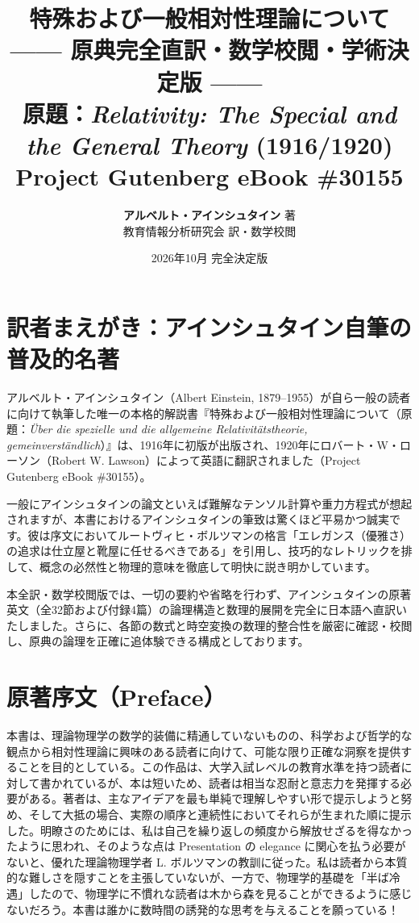 \documentclass[a4paper,11pt,openany]{ltjsbook}
\title{
    {\huge\bfseries\gtfamily 特殊および一般相対性理論について}\\[12pt]
    {\Large\gtfamily —— 原典完全直訳・数学校閲・学術決定版 ——}\\[18pt]
    {\large 原題：\textit{Relativity: The Special and the General Theory} (1916/1920)}\\[6pt]
    {\normalsize Project Gutenberg eBook \#30155}
}
\author{\textbf{アルベルト・アインシュタイン} 著\\[4pt]教育情報分析研究会 訳・数学校閲}
\date{2026年10月 完全決定版}
\begin{document}
\maketitle

\frontmatter

\chapter*{訳者まえがき：アインシュタイン自筆の普及的名著}

アルベルト・アインシュタイン（Albert Einstein, 1879--1955）が自ら一般の読者に向けて執筆した唯一の本格的解説書『特殊および一般相対性理論について（原題：\textit{Über die spezielle und die allgemeine Relativitätstheorie, gemeinverständlich}）』は、1916年に初版が出版され、1920年にロバート・W・ローソン（Robert W. Lawson）によって英語に翻訳されました（Project Gutenberg eBook \#30155）。

一般にアインシュタインの論文といえば難解なテンソル計算や重力方程式が想起されますが、本書におけるアインシュタインの筆致は驚くほど平易かつ誠実です。彼は序文においてルートヴィヒ・ボルツマンの格言「エレガンス（優雅さ）の追求は仕立屋と靴屋に任せるべきである」を引用し、技巧的なレトリックを排して、概念の必然性と物理的意味を徹底して明快に説き明かしています。

本全訳・数学校閲版では、一切の要約や省略を行わず、アインシュタインの原著英文（全32節および付録4篇）の論理構造と数理的展開を完全に日本語へ直訳いたしました。さらに、各節の数式と時空変換の数理的整合性を厳密に確認・校閲し、原典の論理を正確に追体験できる構成としております。

\clearpage
\tableofcontents
\clearpage

\mainmatter


\clearpage
\chapter*{原著序文（Preface）}

本書は、理論物理学の数学的装備に精通していないものの、科学および哲学的な観点から相対性理論に興味のある読者に向けて、可能な限り正確な洞察を提供することを目的としている。この作品は、大学入試レベルの教育水準を持つ読者に対して書かれているが、本は短いため、読者は相当な忍耐と意志力を発揮する必要がある。著者は、主なアイデアを最も単純で理解しやすい形で提示しようと努め、そして大抵の場合、実際の順序と連続性においてそれらが生まれた順に提示した。明瞭さのためには、私は自己を繰り返しの頻度から解放せざるを得なかったように思われ、そのような点は Presentation の elegance に関心を払う必要がないと、優れた理論物理学者 L. ボルツマンの教訓に従った。私は読者から本質的な難しさを隠すことを主張していないが、一方で、物理学的基礎を「半ば冷遇」したので、物理学に不慣れな読者は木から森を見ることができるように感じないだろう。本書は誰かに数時間の誘発的な思考を与えることを願っている！
\end{document}
